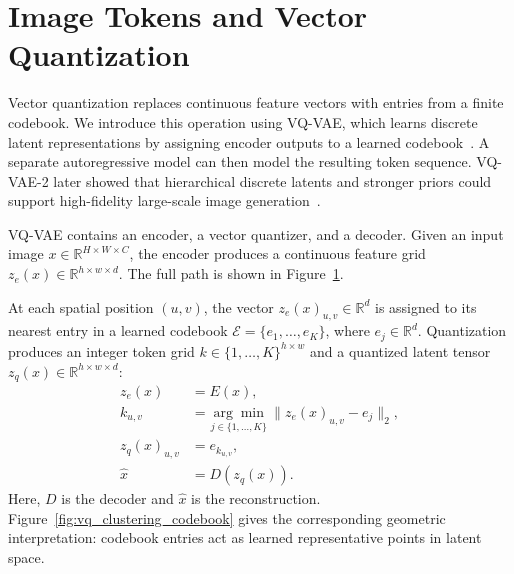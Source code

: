 \section{Image Tokens and Vector Quantization}
\label{sec:image_tokens_vq}

Vector quantization replaces continuous feature vectors with entries from a
finite codebook. We introduce this operation using VQ-VAE, which learns
discrete latent representations by assigning encoder outputs to a learned
codebook~\cite{oord2017neural}. A separate autoregressive model can then model
the resulting token sequence. VQ-VAE-2 later showed that hierarchical discrete
latents and stronger priors could support high-fidelity large-scale image
generation~\cite{razavi2019vqvae2}.

VQ-VAE contains an encoder, a vector quantizer, and a decoder. Given an input
image $x\in\mathbb{R}^{H\times W\times C}$, the encoder produces a continuous
feature grid $z_e(x)\in\mathbb{R}^{h\times w\times d}$. The full path is shown
in Figure~\ref{fig:vqvae_pipeline}.

\begin{figure}[t]
    \centering
    \resizebox{0.9\textwidth}{!}{}
    \label{fig:vqvae_pipeline}
\end{figure}

At each spatial position $(u,v)$, the vector $z_e(x)_{u,v}\in\mathbb{R}^{d}$ is assigned to its nearest entry in a learned codebook
$\mathcal{E}=\{e_1,\ldots,e_K\}$, where $e_j\in\mathbb{R}^{d}$. Quantization produces an integer token grid $k\in\{1,\ldots,K\}^{h\times w}$ and a quantized latent tensor $z_q(x)\in\mathbb{R}^{h\times w\times d}$:
\begin{align}
    z_e(x) &= E(x), \\
    k_{u,v} &= \underset{j\in\{1,\ldots,K\}}{\arg\min}\,
        \lVert z_e(x)_{u,v}-e_j\rVert_2, \\
    z_q(x)_{u,v} &= e_{k_{u,v}}, \\
    \hat{x} &= D\!\left(z_q(x)\right).
\end{align}
Here, $D$ is the decoder and $\hat{x}$ is the reconstruction. Figure~\ref{fig:vq_clustering_codebook} gives the corresponding geometric interpretation: codebook entries act as learned representative points in latent space.

